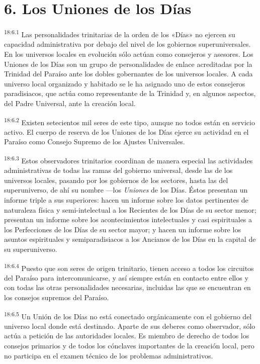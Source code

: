 \section*{6. Los Uniones de los Días}
\par
\textsuperscript{18:6.1} Las personalidades trinitarias de la orden de los «Días» no ejercen su capacidad administrativa por debajo del nivel de los gobiernos superuniversales. En los universos locales en evolución sólo actúan como consejeros y asesores. Los Uniones de los Días son un grupo de personalidades de enlace acreditadas por la Trinidad del Paraíso ante los dobles gobernantes de los universos locales. A cada universo local organizado y habitado se le ha asignado uno de estos consejeros paradisiacos, que actúa como representante de la Trinidad y, en algunos aspectos, del Padre Universal, ante la creación local.

\par
\textsuperscript{18:6.2} Existen setecientos mil seres de este tipo, aunque no todos están en servicio activo. El cuerpo de reserva de los Uniones de los Días ejerce su actividad en el Paraíso como Consejo Supremo de los Ajustes Universales.

\par
\textsuperscript{18:6.3} Estos observadores trinitarios coordinan de manera especial las actividades administrativas de todas las ramas del gobierno universal, desde las de los universos locales, pasando por los gobiernos de los sectores, hasta las del superuniverso, de ahí su nombre ---los \textit{Uniones} de los Días. Éstos presentan un informe triple a sus superiores: hacen un informe sobre los datos pertinentes de naturaleza física y semi-intelectual a los Recientes de los Días de su sector menor; presentan un informe sobre los acontecimientos intelectuales y casi espirituales a los Perfecciones de los Días de su sector mayor; y hacen un informe sobre los asuntos espirituales y semiparadisiacos a los Ancianos de los Días en la capital de su superuniverso.

\par
\textsuperscript{18:6.4} Puesto que son seres de origen trinitario, tienen acceso a todos los circuitos del Paraíso para intercomunicarse, y así siempre están en contacto entre ellos y con todas las otras personalidades necesarias, incluidas las que se encuentran en los consejos supremos del Paraíso.

\par
\textsuperscript{18:6.5} Un Unión de los Días no está conectado orgánicamente con el gobierno del universo local donde está destinado. Aparte de sus deberes como observador, sólo actúa a petición de las autoridades locales. Es miembro de derecho de todos los consejos primarios y de todos los cónclaves importantes de la creación local, pero no participa en el examen técnico de los problemas administrativos.

